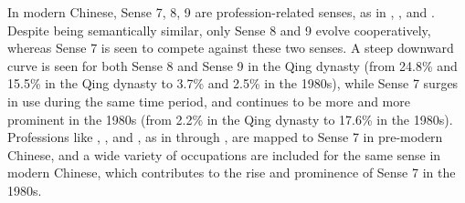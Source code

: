 \begin{exe}
\end{exe}

In modern Chinese, Sense 7, 8, 9 are profession-related senses, as in , , and . Despite being semantically similar, only Sense 8 and 9 evolve cooperatively, whereas Sense 7 is seen to compete against these two senses. A steep downward curve is seen for both Sense 8 and Sense 9 in the Qing dynasty (from 24.8\% and 15.5\% in the Qing dynasty to 3.7\% and 2.5\% in the 1980s), while Sense 7 surges in use during the same time period, and continues to be more and more prominent in the 1980s (from 2.2\% in the Qing dynasty to 17.6\% in the 1980s). Professions like , , and , as in  through , are mapped to Sense 7 in pre-modern Chinese, and a wide variety of occupations are included for the same sense in modern Chinese, which contributes to the rise and prominence of Sense 7 in the 1980s.

